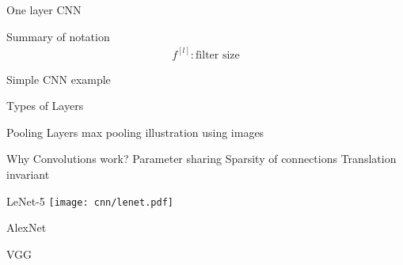 \documentclass{beamer}
\begin{document}
\begin{frame}{One layer CNN}
\end{frame}

\begin{frame}{Summary of notation}
\begin{align}
f^{[l]}: \text{filter size}
\end{align}
\end{frame}

\begin{frame}{Simple CNN example}
\end{frame}

\begin{frame}{Types of Layers}
\end{frame}

\begin{frame}{Pooling Layers}
max pooling illustration using images
\end{frame}

\begin{frame}{Why Convolutions work?}
Parameter sharing
Sparsity of connections 
Translation invariant
\end{frame}


\begin{frame}{LeNet-5}
\texttt{[image: cnn/lenet.pdf]}
\end{frame}

\begin{frame}{AlexNet}
\end{frame}

\begin{frame}{VGG}
\end{frame}
\end{document}
